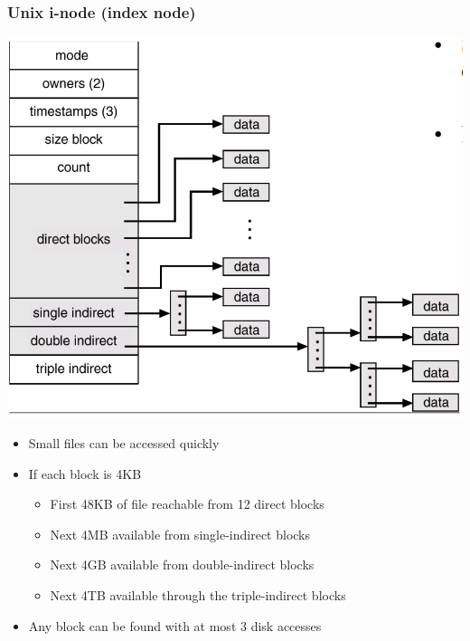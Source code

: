 \documentclass[12pt]{article}
\begin{document}
\subsubsection{Unix i-node (index node)}
\includegraphics[width=\textwidth]{UnixI-node.png}
\begin{itemize}
    \item Small files can be accessed quickly 
    \item If each block is 4KB \begin{itemize}
        \item First 48KB of file reachable from 12 direct blocks 
        \item Next 4MB available from single-indirect blocks
        \item Next 4GB available from double-indirect blocks 
        \item Next 4TB available through the triple-indirect blocks
    \end{itemize} 
    \item Any block can be found with at most 3 disk accesses
\end{itemize}
\end{document}
